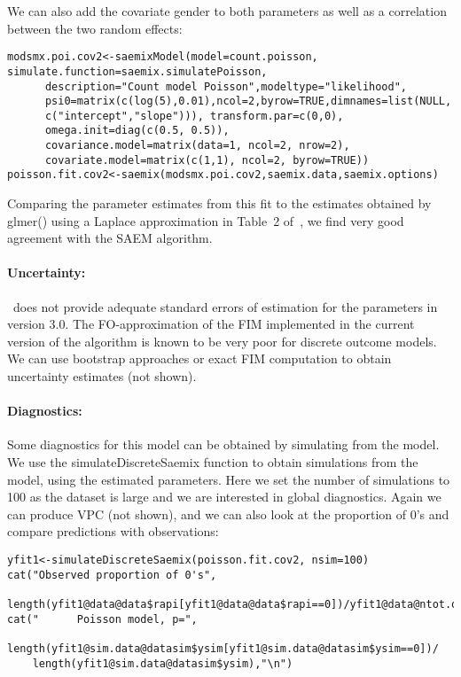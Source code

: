 We can also add the covariate gender to both parameters as well as a correlation between the two random effects:
\begin{verbatim}
modsmx.poi.cov2<-saemixModel(model=count.poisson, simulate.function=saemix.simulatePoisson,
      description="Count model Poisson",modeltype="likelihood",   
      psi0=matrix(c(log(5),0.01),ncol=2,byrow=TRUE,dimnames=list(NULL, 
      c("intercept","slope"))), transform.par=c(0,0), 
      omega.init=diag(c(0.5, 0.5)), 
      covariance.model=matrix(data=1, ncol=2, nrow=2),
      covariate.model=matrix(c(1,1), ncol=2, byrow=TRUE))
poisson.fit.cov2<-saemix(modsmx.poi.cov2,saemix.data,saemix.options)
\end{verbatim}
Comparing the parameter estimates from this fit to the estimates obtained by {\sf glmer()} using a Laplace approximation in Table~2 of~\cite{Atkins13}, we find very good agreement with the SAEM algorithm.

\paragraph{Uncertainty:} \monolix~does not provide adequate standard errors of estimation for the parameters in version 3.0. The FO-approximation of the FIM implemented in the current version of the algorithm is known to be very poor for discrete outcome models. We can use bootstrap approaches or exact FIM computation to obtain uncertainty estimates (not shown).

\paragraph{Diagnostics:} Some diagnostics for this model can be obtained by simulating from the model. We use the {\sf simulateDiscreteSaemix} function to obtain simulations from the model, using the estimated parameters. Here we set the number of simulations to 100 as the dataset is large and we are interested in global diagnostics. Again we can produce VPC (not shown), and we can also look at the proportion of 0's and compare predictions with observations:
\begin{verbatim}
yfit1<-simulateDiscreteSaemix(poisson.fit.cov2, nsim=100)
cat("Observed proportion of 0's", 
     length(yfit1@data@data$rapi[yfit1@data@data$rapi==0])/yfit1@data@ntot.obs,"\n")
cat("      Poisson model, p=",
    length(yfit1@sim.data@datasim$ysim[yfit1@sim.data@datasim$ysim==0])/
    length(yfit1@sim.data@datasim$ysim),"\n") 
\end{verbatim}


